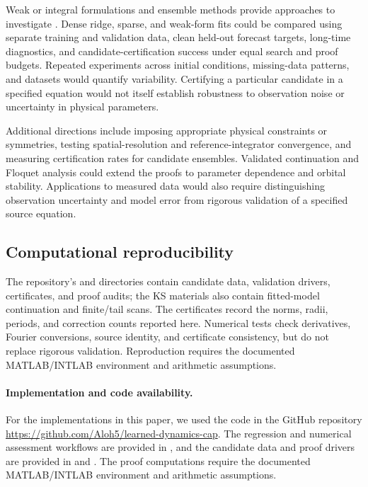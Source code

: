\documentclass[11pt]{article}
\begin{document}
Weak or integral formulations and ensemble methods provide approaches to
investigate \cite{messengerWeak2021,messenger2021,fasel2022}. Dense ridge,
sparse, and weak-form fits could be compared using separate training and
validation data, clean held-out forecast targets, long-time diagnostics,
and candidate-certification success under equal search and proof budgets.
Repeated experiments across initial conditions, missing-data patterns, and
datasets would quantify variability. Certifying a particular candidate in a
specified equation would not itself establish robustness to observation noise
or uncertainty in physical parameters.

Additional directions include imposing appropriate physical constraints or
symmetries, testing spatial-resolution and reference-integrator convergence,
and measuring certification rates for candidate ensembles. Validated
continuation and Floquet analysis could extend the proofs to parameter
dependence and orbital stability. Applications to measured data would also
require distinguishing observation uncertainty and model error from rigorous
validation of a specified source equation.

\subsection{Computational reproducibility}
The repository's  and 
directories contain candidate data, validation drivers, certificates, and proof
audits; the KS materials also contain fitted-model continuation and finite/tail
scans. The certificates record the norms, radii, periods, and correction counts
reported here. Numerical tests check derivatives, Fourier conversions, source
identity, and certificate consistency, but do not replace rigorous validation.
Reproduction requires the documented MATLAB/INTLAB environment and arithmetic
assumptions.

\paragraph{Implementation and code availability.}
For the implementations in this paper, we used the code in the GitHub
repository \url{https://github.com/Aloh5/learned-dynamics-cap}.
The regression and numerical assessment workflows are provided in
, and the candidate data and proof drivers are provided in
 and . The proof computations
require the documented MATLAB/INTLAB environment and arithmetic assumptions.
\end{document}
